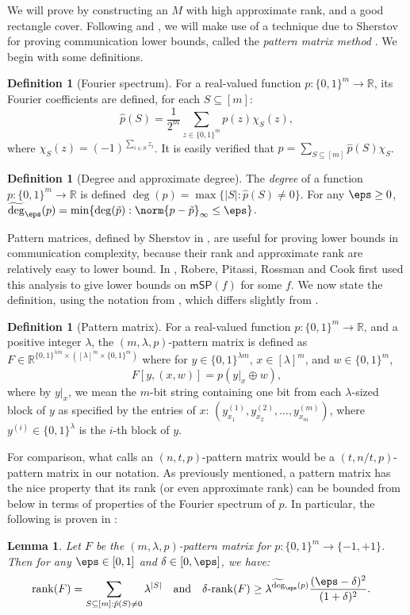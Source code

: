 \documentclass[11pt]{article}
\numberwithin{equation}{section}
\newtheorem{lemma}[theorem]{Lemma}
\theoremstyle{definition}
\newtheorem{definition}[theorem]{Definition}
\theoremstyle{plain}
\newcommand{\R}{\mathbb R}
\begin{document}
We will prove  by constructing an $M$ with high approximate rank, and a good rectangle cover. Following \cite{RPRC16} and \cite{PR17}, we will make use of a technique due to Sherstov for proving communication lower bounds, called the \emph{pattern matrix method} \cite{She09}.
We begin with some definitions. 

\begin{definition}[Fourier spectrum] 
For a real-valued function $p:\{0,1\}^m\rightarrow\R$, its Fourier coefficients are defined, for each $S\subseteq[m]$:
$$\hat{p}(S)=\frac{1}{2^m}\sum_{z\in\{0,1\}^m}p(z)\chi_S(z),$$
where $\chi_S(z)=(-1)^{\sum_{i\in S}z_i}$. It is easily verified that $p=\sum_{S\subseteq[m]}\hat{p}(S)\chi_S$. 
\end{definition}

\begin{definition}[Degree and approximate degree]
The \emph{degree} of a function $p:\{0,1\}^m\rightarrow\R$ is defined $\deg(p)=\max\{|S|:\hat{p}(S)\neq 0\}$. For any $\eps\geq 0$, $\widetilde{\deg}_{\eps}(p)=\min\{\deg(\tilde p):\norm{p-\tilde p}_\infty\leq \eps\}$.
\end{definition}

Pattern matrices, defined by Sherstov in \cite{She09}, are useful for proving lower bounds in communication complexity, because their rank and approximate rank are relatively easy to lower bound. In \cite{RPRC16}, Robere, Pitassi, Rossman and Cook first used this analysis to give lower bounds on $\mathsf{mSP}(f)$ for some $f$. 
We now state the definition, using the notation from \cite{PR17}, which differs slightly from \cite{She09}.
\begin{definition}[Pattern matrix]\label{def:pattern}
For a real-valued function $p:\{0,1\}^m\rightarrow\R$, and a positive integer $\lambda$, the $(m,\lambda,p)$-pattern matrix is defined as $F\in\R^{\{0,1\}^{\lambda m}\times ([\lambda]^m\times \{0,1\}^m)}$ where for $y\in \{0,1\}^{\lambda m}$, $x\in [\lambda]^m$, and $w\in\{0,1\}^m$, 
$$F[y,(x,w)]=p(y|_x\oplus w),$$
where by $y|_x$, we mean the $m$-bit string containing one bit from each $\lambda$-sized block of $y$ as specified by the entries of $x$: $(y^{(1)}_{x_1},y^{(2)}_{x_2},\dots,y^{(m)}_{x_m})$, where $y^{(i)}\in\{0,1\}^\lambda$ is the $i$-th block of $y$.
\end{definition}
For comparison, what \cite{She09} calls an $(n,t,p)$-pattern matrix would be a $(t,n/t,p)$-pattern matrix in our notation. As previously mentioned, a pattern matrix has the nice property that its rank (or even approximate rank) can be
bounded from below %
in terms of properties of the Fourier spectrum of $p$. In particular, the following is proven in \cite{She09}: 
\begin{lemma}\label{lem:Sherstov}
Let $F$ be the $(m,\lambda,p)$-pattern matrix for $p:\{0,1\}^m\rightarrow\{-1,+1\}$. Then for any $\eps\in[0,1]$ and $\delta\in [0,\eps]$, we have:
\begin{align*}
\mathrm{rank}(F)=\sum_{S\subseteq[m]:\hat{p}(S)\neq 0}\lambda^{|S|}
&\quad \mbox{and}\quad \delta\mbox{-}\mathrm{rank}(F)\geq \lambda^{\widetilde{\deg}_\eps(p)}\frac{(\eps-\delta)^2}{(1+\delta)^2}.
\end{align*}
\end{lemma}
\end{document}
